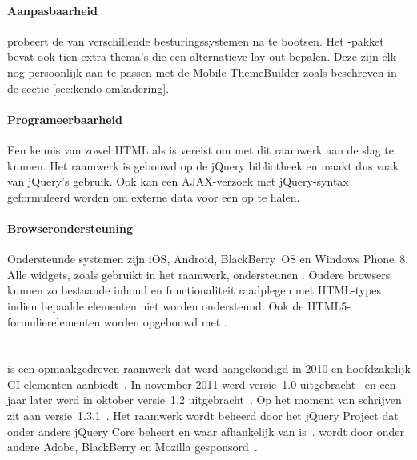 \paragraph{Aanpasbaarheid}
\kendo{} probeert de  van verschillende besturingssystemen na te bootsen.
Het \kendo{}-pakket bevat ook tien extra thema's die een alternatieve lay-out bepalen.
Deze zijn elk nog persoonlijk aan te passen met de Mobile ThemeBuilder zoals beschreven in de sectie \ref{sec:kendo-omkadering}.

\paragraph{Programeerbaarheid}
Een kennis van zowel HTML als \js{} is vereist om met dit raamwerk aan de slag te kunnen.
Het raamwerk is gebouwd op de jQuery bibliotheek en maakt dus vaak van jQuery's  gebruik.
Ook kan een AJAX-verzoek met jQuery-syntax geformuleerd worden om externe data voor een  op te halen.

\paragraph{Browserondersteuning}
Ondersteunde systemen zijn iOS, Android, BlackBerry~OS en Windows Phone~8.
Alle widgets, zoals gebruikt in het raamwerk, ondersteunen .
Oudere browsers kunnen zo bestaande inhoud en functionaliteit raadplegen met  HTML-types indien bepaalde elementen niet worden ondersteund.
Ook de HTML5-formulierelementen worden opgebouwd met .


\section{\jqm}
\label{sec:raamwerk-jqm}
\jqm{} is een opmaakgedreven raamwerk dat werd aangekondigd in 2010 en hoofdzakelijk GI-elementen aanbiedt~\cite{Resig2010}.
In november 2011 werd versie~1.0 uitgebracht~\cite{Parker2011} en een jaar later werd in oktober versie~1.2 uitgebracht~\cite{Parker2012}. 
Op het moment van schrijven zit \jqm{} aan versie~1.3.1~\cite{Parker2013b}. 
Het raamwerk wordt beheerd door het jQuery Project dat onder andere jQuery Core beheert en waar \jqm{} afhankelijk van is~\cite{JQuery2012}. 
\jqm{} wordt door onder andere Adobe, BlackBerry en Mozilla gesponsord~\cite{JQuery2012a}.

